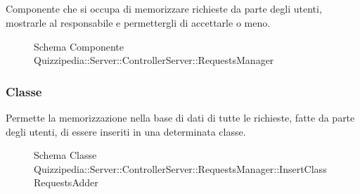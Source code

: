 \subsection{}
Componente che si occupa di memorizzare richieste da parte degli utenti, mostrarle al responsabile e permettergli di accettarle o meno.
\begin{figure}[H]
\centering
\noindent{}
\caption[Schema Componente Quizzipedia::Server::ControllerServer::RequestsManager]{Schema Componente Quizzipedia::Server::ControllerServer::RequestsManager}
\end{figure}
\subsubsection{Classe }
Permette la memorizzazione nella base di dati di tutte le richieste, fatte da parte degli utenti, di essere inseriti in una determinata classe.
\begin{figure}[H]
\centering
\noindent{}
\caption[Schema Classe InsertClassRequestsAdder]{Schema Classe Quizzipedia::Server::ControllerServer::RequestsManager::InsertClassRequestsAdder}
\end{figure}
